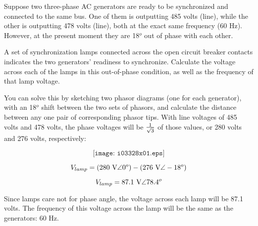 

Suppose two three-phase AC generators are ready to be synchronized and connected to the same bus.  One of them is outputting 485 volts (line), while the other is outputting 478 volts (line), both at the exact same frequency (60 Hz).  However, at the present moment they are 18$^{o}$ out of phase with each other.

\vskip 10pt

A set of synchronization lamps connected across the open circuit breaker contacts indicates the two generators' readiness to synchronize.  Calculate the voltage across each of the lamps in this out-of-phase condition, as well as the frequency of that lamp voltage.







You can solve this by sketching two phasor diagrams (one for each generator), with an 18$^{o}$ shift between the two sets of phasors, and calculate the distance between any one pair of corresponding phasor tips.  With line voltages of 485 volts and 478 volts, the phase voltages will be $1 \over \sqrt{3}$ of those values, or 280 volts and 276 volts, respectively:

$$\texttt{[image: i03328x01.eps]}$$

$$V_{lamp} = (280 \hbox{ V} \angle 0^o) - (276 \hbox{ V} \angle -18^o)$$

$$V_{lamp} = 87.1 \hbox{ V} \angle 78.4^o$$

Since lamps care not for phase angle, the voltage across each lamp will be 87.1 volts.  The frequency of this voltage across the lamp will be the same as the generators: 60 Hz.











